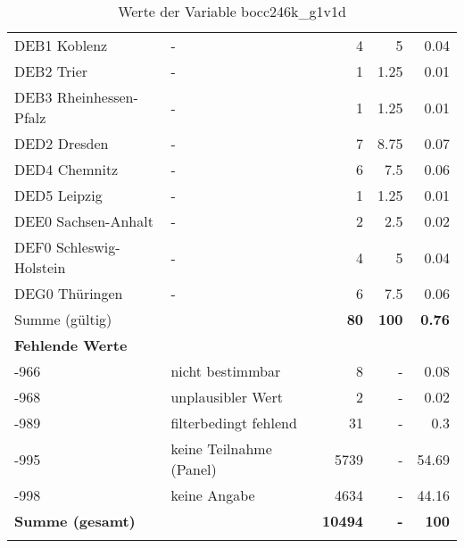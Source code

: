 \begin{longtable}{Xlrrr}
        \multicolumn{1}{X}{DEB1 Koblenz} & - & \num{4} & \num[round-mode=places,round-precision=2]{5} & \num[round-mode=places,round-precision=2]{0.04} \\
        \multicolumn{1}{X}{DEB2 Trier} & - & \num{1} & \num[round-mode=places,round-precision=2]{1.25} & \num[round-mode=places,round-precision=2]{0.01} \\
        \multicolumn{1}{X}{DEB3 Rheinhessen-Pfalz} & - & \num{1} & \num[round-mode=places,round-precision=2]{1.25} & \num[round-mode=places,round-precision=2]{0.01} \\
        \multicolumn{1}{X}{DED2 Dresden} & - & \num{7} & \num[round-mode=places,round-precision=2]{8.75} & \num[round-mode=places,round-precision=2]{0.07} \\
        \multicolumn{1}{X}{DED4 Chemnitz} & - & \num{6} & \num[round-mode=places,round-precision=2]{7.5} & \num[round-mode=places,round-precision=2]{0.06} \\
        \multicolumn{1}{X}{DED5 Leipzig} & - & \num{1} & \num[round-mode=places,round-precision=2]{1.25} & \num[round-mode=places,round-precision=2]{0.01} \\
        \multicolumn{1}{X}{DEE0 Sachsen-Anhalt} & - & \num{2} & \num[round-mode=places,round-precision=2]{2.5} & \num[round-mode=places,round-precision=2]{0.02} \\
        \multicolumn{1}{X}{DEF0 Schleswig-Holstein} & - & \num{4} & \num[round-mode=places,round-precision=2]{5} & \num[round-mode=places,round-precision=2]{0.04} \\
        \multicolumn{1}{X}{DEG0 Thüringen} & - & \num{6} & \num[round-mode=places,round-precision=2]{7.5} & \num[round-mode=places,round-precision=2]{0.06} \\
     \midrule
      \multicolumn{2}{l}{Summe (gültig)} & \textbf{\num{80}} &
      \textbf{\num{100}} &
         \textbf{\num[round-mode=places,round-precision=2]{0.76}} \\
     \multicolumn{5}{l}{\textbf{Fehlende Werte}}\\
       -966 & nicht bestimmbar & \num{8} & - & \num[round-mode=places,round-precision=2]{0.08} \\

       -968 & unplausibler Wert & \num{2} & - & \num[round-mode=places,round-precision=2]{0.02} \\

       -989 & filterbedingt fehlend & \num{31} & - & \num[round-mode=places,round-precision=2]{0.3} \\

       -995 & keine Teilnahme (Panel) & \num{5739} & - & \num[round-mode=places,round-precision=2]{54.69} \\

       -998 & keine Angabe & \num{4634} & - & \num[round-mode=places,round-precision=2]{44.16} \\

     \midrule
     \multicolumn{2}{l}{\textbf{Summe (gesamt)}} & \textbf{\num{10494}} & \textbf{-} & \textbf{\num{100}} \\
     \bottomrule
     \caption{Werte der Variable bocc246k\_g1v1d}
     \end{longtable}
     
